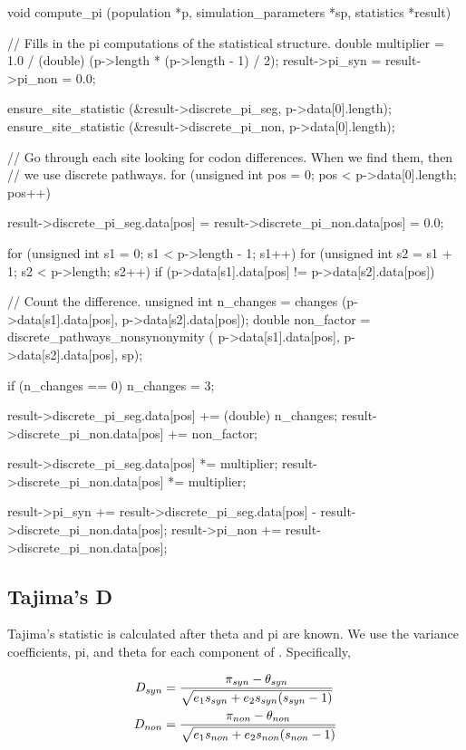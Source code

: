 \documentclass{article}
\begin{document}
\begin{ccode}
void compute_pi (population *p, simulation_parameters *sp, statistics *result) {
  // Fills in the pi computations of the statistical structure.
  double multiplier = 1.0 / (double) (p->length * (p->length - 1) / 2);
  result->pi_syn = result->pi_non = 0.0;

  ensure_site_statistic (&result->discrete_pi_seg, p->data[0].length);
  ensure_site_statistic (&result->discrete_pi_non, p->data[0].length);

  // Go through each site looking for codon differences. When we find them, then
  // we use discrete pathways.
  for (unsigned int pos = 0; pos < p->data[0].length; pos++) {
    result->discrete_pi_seg.data[pos] =
      result->discrete_pi_non.data[pos] = 0.0;

    for (unsigned int s1 = 0; s1 < p->length - 1; s1++)
      for (unsigned int s2 = s1 + 1; s2 < p->length; s2++)
	if (p->data[s1].data[pos] != p->data[s2].data[pos]) {
	  // Count the difference.
	  unsigned int	n_changes  = changes (p->data[s1].data[pos], p->data[s2].data[pos]);
	  double	non_factor = discrete_pathways_nonsynonymity (
	    p->data[s1].data[pos], p->data[s2].data[pos], sp);

	  if (n_changes == 0) n_changes = 3;

	  result->discrete_pi_seg.data[pos] += (double) n_changes;
	  result->discrete_pi_non.data[pos] += non_factor;
	}

    result->discrete_pi_seg.data[pos] *= multiplier;
    result->discrete_pi_non.data[pos] *= multiplier;

    result->pi_syn += result->discrete_pi_seg.data[pos] - result->discrete_pi_non.data[pos];
    result->pi_non += result->discrete_pi_non.data[pos];
  }
}
\end{ccode}

    \subsection{Tajima's D}
      \label{sec:d-statistic}

      Tajima's \D{} statistic is calculated after theta and pi are known. We use
      the variance coefficients, pi, and theta for each component of \D{}.
      Specifically,

      \begin{align*}
	D_{syn} & = {\pi_{syn} - \theta_{syn} \over
		     \sqrt{e_1 s_{syn} + e_2 s_{syn} (s_{syn} - 1)}} \\ %
	D_{non} & = {\pi_{non} - \theta_{non} \over
		     \sqrt{e_1 s_{non} + e_2 s_{non} (s_{non} - 1)}}
      \end{align*}
\end{document}
